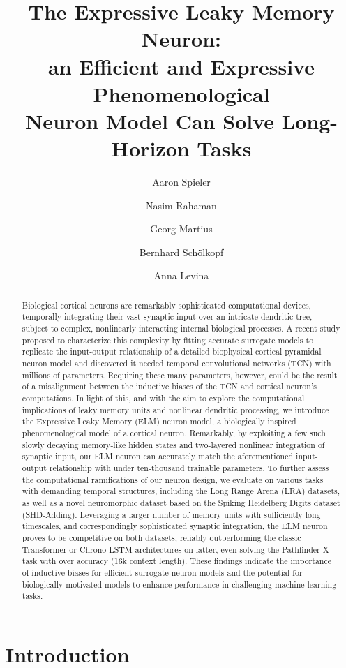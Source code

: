 \documentclass{article} \usepackage{iclr2024_doc_style,times}
\title{The Expressive Leaky Memory Neuron: \\ an Efficient and Expressive Phenomenological \\ Neuron Model Can Solve Long-Horizon Tasks}
\author[1,2]{Aaron Spieler}
\author[3,2]{Nasim Rahaman}
\author[1,2]{Georg Martius}
\author[2]{Bernhard Schölkopf}
\author[1,4]{Anna Levina}
\affil[1]{University of Tübingen}
\affil[2]{Max Planck Institute for Intelligent Systems, Tübingen}
\affil[3]{Mila, Quebec AI Institute}
\affil[4]{Max Planck Institute for Biological Cybernetics, Tübingen}
\begin{document}
\maketitle



\begin{abstract}
Biological cortical neurons are remarkably sophisticated computational devices, temporally integrating their vast synaptic input over an intricate dendritic tree, subject to complex, nonlinearly interacting internal biological processes. 
A recent study proposed to characterize this complexity by fitting accurate surrogate models to replicate the input-output relationship of a detailed biophysical cortical pyramidal neuron model and discovered it needed temporal convolutional networks (TCN) with millions of parameters. 
Requiring these many parameters, however, could be the result of a misalignment between the inductive biases of the TCN and cortical neuron's computations.
In light of this, and with the aim to explore the computational implications of leaky memory units and nonlinear dendritic processing, we introduce the Expressive Leaky Memory (ELM) neuron model, a biologically inspired phenomenological model of a cortical neuron.
Remarkably, by exploiting a few such slowly decaying memory-like hidden states and two-layered nonlinear integration of synaptic input, our ELM neuron can accurately match the aforementioned input-output relationship with under ten-thousand trainable parameters.
To further assess the computational ramifications of our neuron design, we evaluate on various tasks with demanding temporal structures, including the Long Range Arena (LRA) datasets, as well as a novel neuromorphic dataset based on the Spiking Heidelberg Digits dataset (SHD-Adding). Leveraging a larger number of memory units with sufficiently long timescales, and correspondingly sophisticated synaptic integration, the ELM neuron proves to be competitive on both datasets, reliably outperforming the classic Transformer or Chrono-LSTM architectures on latter, even solving the Pathfinder-X task with over  accuracy (16k context length). These findings indicate the importance of inductive biases for efficient surrogate neuron models and the potential for biologically motivated models to enhance performance in challenging machine learning tasks.
\end{abstract}

\section{Introduction}
\label{Introduction}
\end{document}
